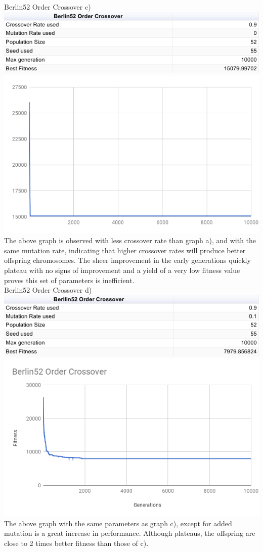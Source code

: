\documentclass[conference]{IEEEtran}
\begin{document}
Berlin52 Order Crossover c)
\includegraphics[scale=0.42]{Berlin52/OC/Berlin52_OC_c)_table}
\includegraphics[scale=0.42]{Berlin52/OC/Berlin52_OC_c)}
The above graph is observed with less crossover rate than graph a), and with the same mutation rate, indicating that higher crossover rates will produce better offspring chromosomes. The sheer improvement in the early generations quickly plateau with no signs of improvement and a yield of a very low fitness value proves this set of parameters is inefficient. \\



Berlin52 Order Crossover d)
\includegraphics[scale=0.42]{Berlin52/OC/Berlin52_OC_d)_table}
\includegraphics[scale=0.42]{Berlin52/OC/Berlin52_OC_d)}
The above graph with the same parameters as graph c), except for added mutation is a great increase in performance. Although plateaus, the offspring are close to 2 times better fitness than those of c). \\
\end{document}
